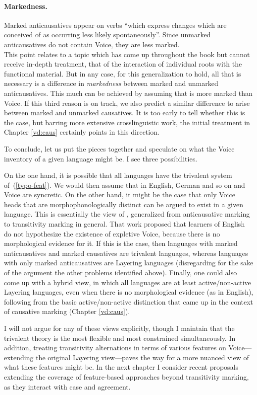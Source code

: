 \paragraph*{Markedness.} Marked anticausatives appear on verbs ``which express changes which are conceived of as occurring less likely spontaneously''. Since unmarked anticausatives do not contain Voice, they are less marked.\\
	This point relates to a topic which has come up throughout the book but cannot receive in-depth treatment, that of the interaction of individual roots with the functional material. But in any case, for this generalization to hold, all that is necessary is a difference in \emph{markedness} between marked and unmarked anticausatives. This much can be achieved by assuming that {\vz} is more marked than Voice. If this third reason is on track, we also predict a similar difference to arise between marked and unmarked causatives. It is too early to tell whether this is the case, but barring more extensive crosslinguistic work, the initial treatment in Chapter \ref{vd:caus} certainly points in this direction.

To conclude, let us put the pieces together and speculate on what the Voice inventory of a given language might be. I see three possibilities.

On the one hand, it is possible that all languages have the trivalent system of~(\ref{typo-feat}). We would then assume that in English, German and so on {\vd} and Voice are syncretic. On the other hand, it might be the case that only Voice heads that are morphophonologically distinct can be argued to exist in a given language. This is essentially the view of \cite{layering15}, generalized from anticausative marking to transitivity marking in general. That work proposed that learners of English do not hypothesize the existence of expletive Voice, because there is no morphological evidence for it. If this is the case, then languages with marked anticausatives and marked causatives are trivalent languages, whereas languages with only marked anticausatives are Layering languages (disregarding for the sake of the argument the other problems identified above). Finally, one could also come up with a hybrid view, in which all languages are at least active/non-active Layering languages, even when there is no morphological evidence (as in English), following from the basic active/non-active distinction that came up in the context of causative marking (Chapter \ref{vd:caus}).

I will not argue for any of these views explicitly, though I maintain that the trivalent theory is the most flexible and most constrained simultaneously. In addition, treating transitivity alternations in terms of various features on Voice---extending the original Layering view---paves the way for a more nuanced view of what these features might be. In the next chapter I consider recent proposals extending the coverage of feature-based approaches beyond transitivity marking, as they interact with case and agreement.

